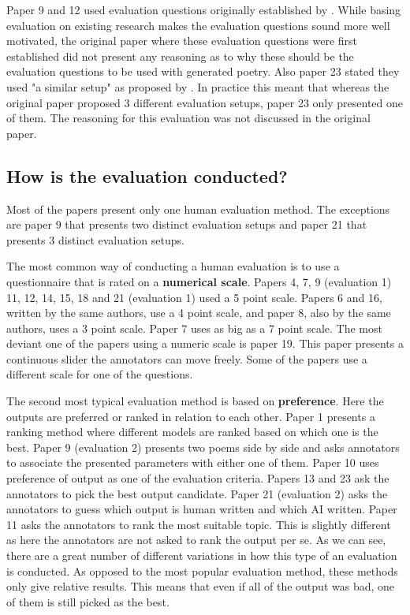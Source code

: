 \documentclass[11pt,a4paper]{article}
\begin{document}
Paper 9 and 12 used evaluation questions originally established by \citet{toivanen2012corpus}. While basing evaluation on existing research makes the evaluation questions sound more well motivated, the original paper where these evaluation questions were first established did not present any reasoning as to why these should be the evaluation questions to be used with generated poetry. Also paper 23 stated they used "a similar setup" as proposed by \citet{li2016deep}. In practice this meant that whereas the original paper proposed 3 different evaluation setups, paper 23 only presented one of them. The reasoning for this evaluation was not discussed in the original paper.

\subsection{How is the evaluation conducted?}

Most of the papers present only one human evaluation method. The exceptions are paper 9 that presents two distinct evaluation setups and paper 21 that presents 3 distinct evaluation setups.

The most common way of conducting a human evaluation is to use a questionnaire that is rated on a \textbf{numerical scale}. Papers 4, 7, 9 (evaluation 1) 11, 12, 14, 15, 18 and 21 (evaluation 1) used a 5 point scale. Papers 6 and 16, written by the same authors, use a 4 point scale, and paper  8, also by the same authors, uses a 3 point scale. Paper 7 uses as big as a 7 point scale. The most deviant one of the papers using a numeric scale is paper 19. This paper presents a continuous slider the annotators can move freely. Some of the papers use a different scale for one of the questions.

The second most typical evaluation method is based on \textbf{preference}. Here the outputs are preferred or ranked in relation to each other. Paper 1 presents a ranking method where different models are ranked based on which one is the best. Paper 9 (evaluation 2) presents two poems side by side and asks annotators to associate the presented parameters with either one of them. Paper 10 uses preference of output as one of the evaluation criteria. Papers 13 and 23 ask the annotators to pick the best output candidate. Paper 21 (evaluation 2) asks the annotators to guess which output is human written and which AI written. Paper 11 asks the annotators to rank the most suitable topic. This is slightly different as here the annotators are not asked to rank the output per se. As we can see, there are a great number of different variations in how this type of an evaluation is conducted. As opposed to the most popular evaluation method, these methods only give relative results. This means that even if all of the output was bad, one of them is still picked as the best.
\end{document}
